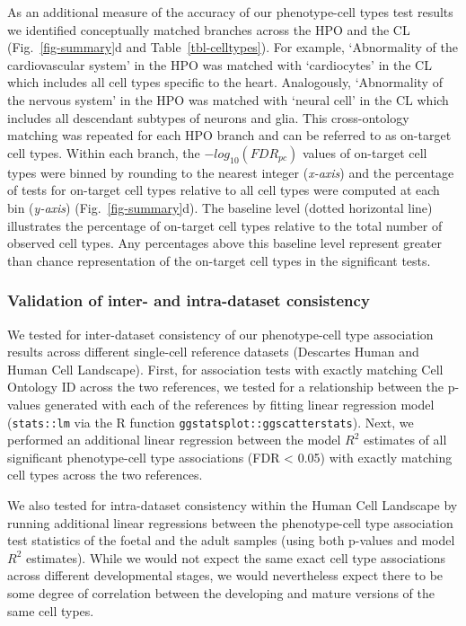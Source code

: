 \documentclass[
]{article}
\begin{document}
As an additional measure of the accuracy of our phenotype-cell types
test results we identified conceptually matched branches across the HPO
and the CL (Fig.~\ref{fig-summary}d and Table~\ref{tbl-celltypes}). For
example, `Abnormality of the cardiovascular system' in the HPO was
matched with `cardiocytes' in the CL which includes all cell types
specific to the heart. Analogously, `Abnormality of the nervous system'
in the HPO was matched with `neural cell' in the CL which includes all
descendant subtypes of neurons and glia. This cross-ontology matching
was repeated for each HPO branch and can be referred to as on-target
cell types. Within each branch, the \(-log_{10}(FDR _{pc})\) values of
on-target cell types were binned by rounding to the nearest integer
(\emph{x-axis}) and the percentage of tests for on-target cell types
relative to all cell types were computed at each bin (\emph{y-axis})
(Fig.~\ref{fig-summary}d). The baseline level (dotted horizontal line)
illustrates the percentage of on-target cell types relative to the total
number of observed cell types. Any percentages above this baseline level
represent greater than chance representation of the on-target cell types
in the significant tests.

\subsubsection{Validation of inter- and intra-dataset
consistency}\label{validation-of-inter--and-intra-dataset-consistency-1}

We tested for inter-dataset consistency of our phenotype-cell type
association results across different single-cell reference datasets
(Descartes Human and Human Cell Landscape). First, for association tests
with exactly matching Cell Ontology ID across the two references, we
tested for a relationship between the p-values generated with each of
the references by fitting linear regression model (\texttt{stats::lm}
via the R function \texttt{ggstatsplot::ggscatterstats}). Next, we
performed an additional linear regression between the model \(R^2\)
estimates of all significant phenotype-cell type associations (FDR
\textless{} 0.05) with exactly matching cell types across the two
references.

We also tested for intra-dataset consistency within the Human Cell
Landscape by running additional linear regressions between the
phenotype-cell type association test statistics of the foetal and the
adult samples (using both p-values and model \(R^2\) estimates). While
we would not expect the same exact cell type associations across
different developmental stages, we would nevertheless expect there to be
some degree of correlation between the developing and mature versions of
the same cell types.
\end{document}
